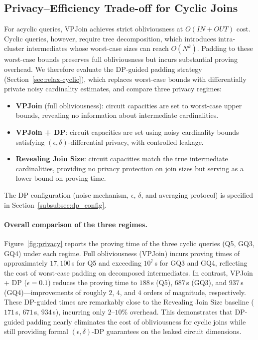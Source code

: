 \documentclass[sigconf]{acmart}
\begin{document}
\subsection{Privacy--Efficiency Trade-off for Cyclic Joins}
\label{subsec:dp_eval}

For acyclic queries, VPJoin achieves strict obliviousness at $O(\mathit{IN}+\mathit{OUT})$ cost. Cyclic queries, however, require tree decomposition, which introduces intra-cluster intermediates whose worst-case sizes can reach $O(N^k)$. Padding to these worst-case bounds preserves full obliviousness but incurs substantial proving overhead. We therefore evaluate the DP-guided padding strategy (Section~\ref{sec:relax-cyclic}), which replaces worst-case bounds with differentially private noisy cardinality estimates, and compare three privacy regimes:
\begin{itemize}[leftmargin=*, itemsep=0.1em]
    \item \textbf{VPJoin} (full obliviousness): circuit capacities are set to worst-case upper bounds, revealing no information about intermediate cardinalities.
    \item \textbf{VPJoin + DP}: circuit capacities are set using noisy cardinality bounds satisfying $(\epsilon,\delta)$-differential privacy, with controlled leakage.
    \item \textbf{Revealing Join Size}: circuit capacities match the true intermediate cardinalities, providing no privacy protection on join sizes but serving as a lower bound on proving time.
\end{itemize}
The DP configuration (noise mechanism, $\epsilon$, $\delta$, and averaging protocol) is specified in Section~\ref{subsubsec:dp_config}.

\paragraph{Overall comparison of the three regimes.}
Figure~\ref{fig:privacy} reports the proving time of the three cyclic queries (Q5, GQ3, GQ4) under each regime. Full obliviousness (VPJoin) incurs proving times of approximately $17{,}100$\,s for Q5 and exceeding $10^7$\,s for GQ3 and GQ4, reflecting the cost of worst-case padding on decomposed intermediates. In contrast, VPJoin + DP ($\epsilon=0.1$) reduces the proving time to $188$\,s (Q5), $687$\,s (GQ3), and $937$\,s (GQ4)---improvements of roughly $2$, $4$, and $4$ orders of magnitude, respectively. These DP-guided times are remarkably close to the Revealing Join Size baseline ($171$\,s, $671$\,s, $934$\,s), incurring only $2$--$10$\% overhead. This demonstrates that DP-guided padding nearly eliminates the cost of obliviousness for cyclic joins while still providing formal $(\epsilon,\delta)$-DP guarantees on the leaked circuit dimensions.
\end{document}
